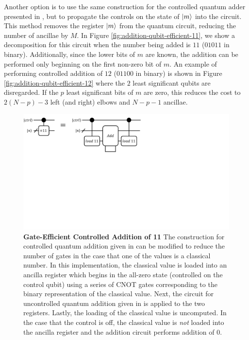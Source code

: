 Another option is to use the same construction for the controlled quantum adder presented in \cite{gidney2018halving}, but to propagate the controls on the state of $\ket{m}$ into the circuit.
This method removes the register $\ket{m}$ from the quantum circuit, reducing the number of ancillae by $M$.
In Figure \ref{fig:addition-qubit-efficient-11}, we show a decomposition for this circuit when the number being added is $11$ ($01011$ in binary).
Additionally, since the lower bits of $m$ are known, the addition can be performed only beginning on the first non-zero bit of $m$.
An example of performing controlled addition of $12$ ($01100$ in binary) is shown in Figure \ref{fig:addition-qubit-efficient-12} where the $2$ least significant qubits are disregarded.
If the $p$ least significant bits of $m$ are zero, this reduces the cost to $2(N - p) - 3$ left (and right) elbows and $N - p - 1$ ancillae.

\begin{figure}
    \centering
    \includegraphics[width=12cm]{figures/ctrl-add-11-gate-efficient.pdf}
    \caption{
        \textbf{Gate-Efficient Controlled Addition of 11}
        The construction for controlled quantum addition given in \cite{gidney2018halving} can be modified to reduce the number of gates in the case that one of the values is a classical number.
        In this implementation, the classical value is loaded into an ancilla register which begins in the all-zero state (controlled on the control qubit) using a series of CNOT gates corresponding to the binary representation of the classical value.
        Next, the circuit for uncontrolled quantum addition given in \cite{gidney2018halving} is applied to the two registers.
        Lastly, the loading of the classical value is uncomputed.
        In the case that the control is off, the classical value is \textit{not} loaded into the ancilla register and the addition circuit performs addition of $0$.
    }
    \label{fig:addition-gate-efficient}
\end{figure}

